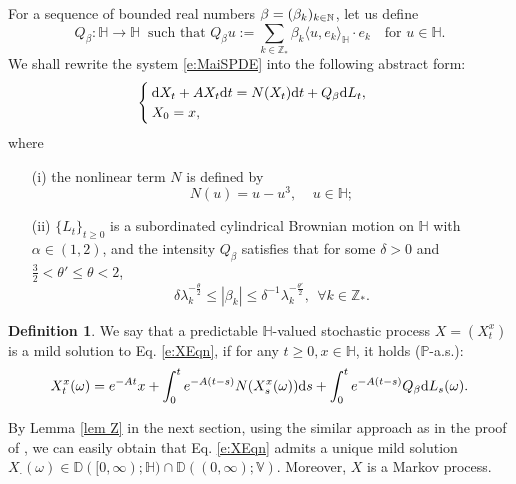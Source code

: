 \documentclass[12pt,a4paper]{article}
\theoremstyle{definition}
\newtheorem{defn}[theorem]{Definition}
\theoremstyle{remark}
\numberwithin{equation}{section}
\newcommand{\DD}{\mathbb{D}}
\newcommand{\HH}{\mathbb{H}}
\newcommand{\VV}{\mathbb{V}}
\newcommand{\Z}{\mathbb{Z}}
\newcommand{\bdef}{\begin{defn}}
\newcommand{\ndef}{\end{defn}}
\newcommand{\dif}{{\rm d}}
\begin{document}
{For a sequence of bounded real numbers $\beta=(\beta_{k})_{k\in\mathbb N}$, let us define
 $$
 Q_{\beta}:\HH\rightarrow\HH \  \text{ such that }    Q_{\beta}u:=\sum_{k\in \Z_*} \beta_k\langle u,e_k\rangle_{\HH}\cdot e_k\ \ \  \text{ for } u\in \HH.
$$
\vskip0.3cm
We shall rewrite the system \eqref{e:MaiSPDE} into  the following abstract form:
\begin{equation} \label{e:XEqn}
\begin{cases}
\dif X_t+ A X_t\dif t=N(X_t) \dif t+ Q_{\beta}\dif L_t, \\
X_0=x,
\end{cases}
\end{equation}
where
\begin{itemize}
\item[(i)] the nonlinear term $N$ is defined by
\begin{equation*} \label{e:NonlinearB}
N(u)= u-u^3, \ \ \ \ \ u \in \HH;
\end{equation*}
\item[(ii)] $\{L_t\}_{t\ge0}$ is a subordinated cylindrical Brownian motion  on $\HH$ with $\alpha\in (1,2)$, and the intensity  $Q_{\beta}$ satisfies that for some $\delta>0$ and $\frac 32<\theta'\le \theta <2$,
    $$
    \delta \lambda_k^{-\frac{\theta}{2}}\le |\beta_k|\le \delta^{-1}\lambda_k^{-\frac{\theta'}{2}}, \ \ \forall k\in \Z_*.
  $$
    \end{itemize}



\vskip0.3cm

\bdef
\label{d:MSoln}
We say that a predictable $\HH$-valued stochastic process $X=(X_t^x)$ is a mild solution to Eq. \eqref{e:XEqn}, if for any $t\ge0, x\in \HH$, it holds ($\mathbb P$-a.s.):
\begin{equation}\label{e: mild solution}
X^x_t(\omega)=e^{-At} x+\int_0^t e^{-A(t-s)} N(X_s^x(\omega))\dif s+\int_0^t e^{-A(t-s)} Q_{\beta} \dif L_s(\omega).
\end{equation}
\ndef




By Lemma \ref{lem Z} in the next section,  using the similar approach  as in the proof of \cite[Theorem 2.2]{Xu13}, we can    easily obtain that    Eq. \eqref{e:XEqn} admits a unique mild solution $X_{\cdot}(\omega)\in \DD([0,\infty);\HH)\cap \DD((0,\infty);\VV)$. Moreover, $X$ is a Markov process.





\vskip0.3cm


}
\end{document}
